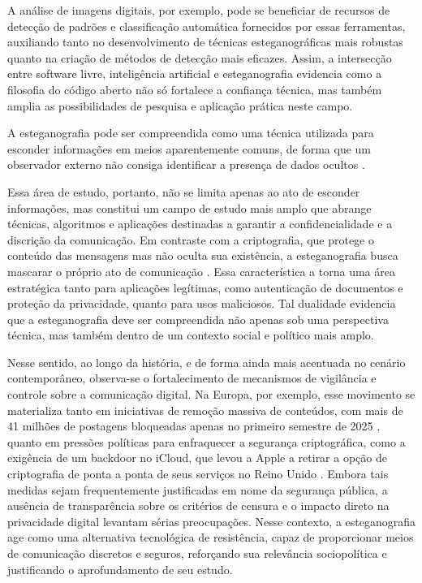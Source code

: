 \documentclass[12pt]{article}
\begin{document}
A análise de imagens digitais, por exemplo, pode se beneficiar de recursos de
detecção de padrões e classificação automática fornecidos por essas
ferramentas, auxiliando tanto no desenvolvimento de técnicas esteganográficas
mais robustas quanto na criação de métodos de detecção mais eficazes. Assim, a
intersecção entre software livre, inteligência artificial e esteganografia
evidencia como a filosofia do código aberto não só fortalece a confiança
técnica, mas também amplia as possibilidades de pesquisa e aplicação prática
neste campo.

A esteganografia pode ser compreendida como uma técnica utilizada para esconder
informações em meios aparentemente comuns, de forma que um observador externo
não consiga identificar a presença de dados ocultos \cite{Fridrich2010}.

Essa área de estudo, portanto, não se limita apenas ao ato de esconder
informações, mas constitui um campo de estudo mais amplo que abrange técnicas,
algoritmos e aplicações destinadas a garantir a confidencialidade e a discrição
da comunicação. Em contraste com a criptografia, que protege o conteúdo das
mensagens mas não oculta sua existência, a esteganografia busca mascarar o
próprio ato de comunicação \cite{Fridrich2010}. Essa característica a torna uma
área estratégica tanto para aplicações legítimas, como autenticação de
documentos e proteção da privacidade, quanto para usos maliciosos. Tal
dualidade evidencia que a esteganografia deve ser compreendida não apenas sob
uma perspectiva técnica, mas também dentro de um contexto social e político
mais amplo.

Nesse sentido, ao longo da história, e de forma ainda mais acentuada no cenário
contemporâneo, observa-se o fortalecimento de mecanismos de vigilância e
controle sobre a comunicação digital. Na Europa, por exemplo, esse movimento se
materializa tanto em iniciativas de remoção massiva de conteúdos, com mais de
41 milhões de postagens bloqueadas apenas no primeiro semestre de 2025
\cite{poder3602025}, quanto em pressões políticas para enfraquecer a segurança
criptográfica, como a exigência de um backdoor no iCloud, que levou a Apple a
retirar a opção de criptografia de ponta a ponta de seus serviços no Reino
Unido \cite{guardian2025}. Embora tais medidas sejam frequentemente
justificadas em nome da segurança pública, a ausência de transparência sobre os
critérios de censura e o impacto direto na privacidade digital levantam sérias
preocupações. Nesse contexto, a esteganografia age como uma alternativa
tecnológica de resistência, capaz de proporcionar meios de comunicação
discretos e seguros, reforçando sua relevância sociopolítica e justificando o
aprofundamento de seu estudo.
\end{document}
